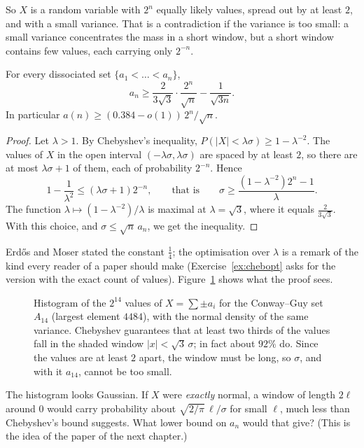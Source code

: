 So $X$ is a random variable with $2^n$ equally likely values, spread out by at least $2$, and with a small variance. That is a
contradiction if the variance is too small: a small variance concentrates the mass in a short window, but a short window
contains few values, each carrying only $2^{-n}$.

\begin{theorem}\label{thm:erdosmoser}
For every dissociated set $\{a_1<\dots<a_n\}$,
\[
a_n\ge\frac2{3\sqrt3}\cdot\frac{2^n}{\sqrt n}-\frac1{\sqrt{3n}}.
\]
In particular $a(n)\ge(0.384-o(1))\,2^n/\sqrt n$.
\end{theorem}

\begin{proof}
Let $\lambda>1$. By Chebyshev's inequality, $P(|X|<\lambda\sigma)\ge1-\lambda^{-2}$. The values of $X$ in the open interval $(-\lambda\sigma,\lambda\sigma)$ are spaced by at least $2$,
so there are at most $\lambda\sigma+1$ of them, each of probability $2^{-n}$. Hence
\[
1-\frac1{\lambda^2}\le(\lambda\sigma+1)2^{-n},\qquad\text{that is}\qquad\sigma\ge\frac{(1-\lambda^{-2})2^n-1}\lambda.
\]
The function $\lambda\mapsto(1-\lambda^{-2})/\lambda$ is maximal at $\lambda=\sqrt3$, where it equals $\frac2{3\sqrt3}$. With this choice, and $\sigma\le\sqrt n\,a_n$, we get the
inequality.
\end{proof}

Erd\H os and Moser stated the constant $\frac14$; the optimisation over $\lambda$ is a remark of the kind every reader of a paper should make
(Exercise~\ref{ex:chebopt} asks for the version with the exact count of values). Figure~\ref{fig:sums} shows what the proof sees.

\begin{figure}[ht]
\centering
{}
\caption{Histogram of the $2^{14}$ values of $X=\sum\pm a_i$ for the Conway--Guy set $A_{14}$ (largest element $4484$), with the normal density of
the same variance. Chebyshev guarantees that at least two thirds of the values fall in the shaded window $|x|<\sqrt3\,\sigma$; in fact about
$92\%$ do. Since the values are at least $2$ apart, the window must be long, so $\sigma$, and with it $a_{14}$, cannot be too small.}
\label{fig:sums}
\end{figure}

\begin{think}
The histogram looks Gaussian. If $X$ were \emph{exactly} normal, a window of length $2\ell$ around $0$ would carry probability about
$\sqrt{2/\pi}\,\ell/\sigma$ for small $\ell$, much less than Chebyshev's bound suggests. What lower bound on $a_n$ would that give? (This is the idea of the paper of the
next chapter.)
\end{think}

